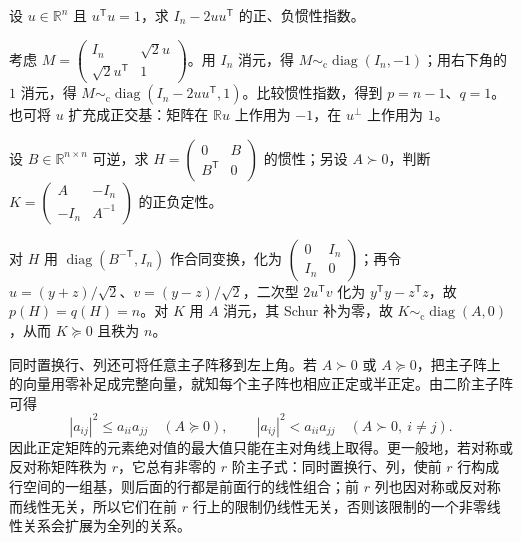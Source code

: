\begin{example}
\label{ex:xie-ex-qf-reflection}
设 $u\in\mathbb R^n$ 且 $u^{\mathsf T}u=1$，求 $I_n-2uu^{\mathsf T}$ 的正、负惯性指数。
\end{example}
\begin{solve}
考虑 $M=\begin{pmatrix}I_n&\sqrt2u\\\sqrt2u^{\mathsf T}&1\end{pmatrix}$。用 $I_n$ 消元，得 $M\sim_{\mathrm c}\operatorname{diag}(I_n,-1)$；用右下角的 $1$ 消元，得 $M\sim_{\mathrm c}\operatorname{diag}(I_n-2uu^{\mathsf T},1)$。比较惯性指数，得到 $p=n-1$、$q=1$。也可将 $u$ 扩充成正交基：矩阵在 $\mathbb Ru$ 上作用为 $-1$，在 $u^\perp$ 上作用为 $1$。
\end{solve}

\begin{example}
设 $B\in\mathbb R^{n\times n}$ 可逆，求 $H=\begin{pmatrix}0&B\\B^{\mathsf T}&0\end{pmatrix}$ 的惯性；另设 $A\succ0$，判断 $K=\begin{pmatrix}A&-I_n\\-I_n&A^{-1}\end{pmatrix}$ 的正负定性。
\end{example}
\begin{solve}
对 $H$ 用 $\operatorname{diag}(B^{-\mathsf T},I_n)$ 作合同变换，化为 $\begin{pmatrix}0&I_n\\I_n&0\end{pmatrix}$；再令 $u=(y+z)/\sqrt2$、$v=(y-z)/\sqrt2$，二次型 $2u^{\mathsf T}v$ 化为 $y^{\mathsf T}y-z^{\mathsf T}z$，故 $p(H)=q(H)=n$。对 $K$ 用 $A$ 消元，其 Schur 补为零，故 $K\sim_{\mathrm c}\operatorname{diag}(A,0)$，从而 $K\succeq0$ 且秩为 $n$。
\end{solve}

同时置换行、列还可将任意主子阵移到左上角。若 $A\succ0$ 或 $A\succeq0$，把主子阵上的向量用零补足成完整向量，就知每个主子阵也相应正定或半正定。由二阶主子阵可得
\begin{equation}
 |a_{ij}|^2\le a_{ii}a_{jj}\quad(A\succeq0),\qquad
 |a_{ij}|^2<a_{ii}a_{jj}\quad(A\succ0,\ i\ne j).
 \label{eq:xie-ex-qf-entry-bound}
\end{equation}
因此正定矩阵的元素绝对值的最大值只能在主对角线上取得。更一般地，若对称或反对称矩阵秩为 $r$，它总有非零的 $r$ 阶主子式：同时置换行、列，使前 $r$ 行构成行空间的一组基，则后面的行都是前面行的线性组合；前 $r$ 列也因对称或反对称而线性无关，所以它们在前 $r$ 行上的限制仍线性无关，否则该限制的一个非零线性关系会扩展为全列的关系。

